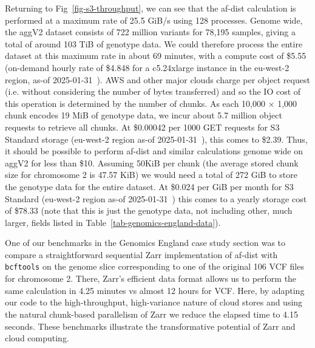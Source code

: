 \documentclass[a4paper,num-refs]{oup-contemporary}
\begin{document}
Returning to Fig~\ref{fig-s3-throughput}, we can see that the af-dist
calculation is performed at a maximum rate of 25.5 GiB/s using 128
processes. Genome wide, the aggV2 dataset consists of
722 million variants for 78,195 samples, giving a total of around
103 TiB of genotype data. We could therefore process the entire
dataset at this maximum rate in about 69 minutes, with a compute
cost of \$5.55
(on-demand hourly rate of \$4.848 for a c5.24xlarge instance
in the eu-west-2 region, as-of 2025-01-31~\cite{ec2-pricing}).
AWS and other major clouds charge per object request (i.e. without
considering the number of bytes transferred) and so the IO
cost of this operation is determined by the number of chunks.
As each 10,000 $\times$ 1,000 chunk encodes 19 MiB of 
genotype data, we incur about 5.7 million object requests
to retrieve all chunks. 
At \$0.00042 per 1000 GET requests for S3 Standard
storage 
(eu-west-2 region as-of 2025-01-31~\cite{s3-pricing}), 
this comes to \$2.39.
Thus, it should be possible to perform af-dist and similar
calculations genome wide on aggV2 for less than \$10.
Assuming 50KiB per chunk (the average stored chunk size 
for chromosome 2 is 47.57 KiB) we would need a total
of 272 GiB to store the genotype data for the entire dataset.
At \$0.024 per GiB per month for S3 Standard
(eu-west-2 region as-of 2025-01-31~\cite{s3-pricing})
this comes to a yearly storage cost of \$78.33
(note that this is just the genotype data, not including
other, much larger, fields 
listed in Table~\ref{tab-genomics-england-data}).

One of our benchmarks in the Genomics England case
study section was to compare a straightforward
sequential Zarr implementation of af-dist with
\texttt{bcftools} 
on the genome slice corresponding to one of the original
106 VCF files for chromosome 2. There, Zarr's efficient data format
allows us to perform the same calculation in 4.25
minutes vs almost 12 hours for VCF. 
Here, by adapting our code to the 
high-throughput, high-variance nature of cloud stores and 
using the natural chunk-based parallelism of Zarr
we reduce the elapsed time to 4.15 seconds.
These benchmarks illustrate the transformative 
potential of Zarr and cloud computing.
\end{document}
